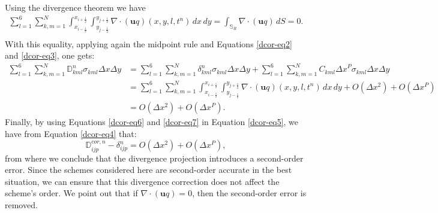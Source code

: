 Using the divergence theorem we have
\begin{align*}
	\sum_{l=1}^6 \sum_{k,m=1}^N
	\int_{x_{i-{\frac{1}{2}}}}^{x_{i+{\frac{1}{2}}}}
	\int_{y_{j-{\frac{1}{2}}}}^{y_{j+{\frac{1}{2}}}}
	\nabla \cdot (\boldsymbol{u} q)(x,y,l,t^n) \,dx \,dy
	= \int_{\mathbb{S}_R} 	\nabla \cdot (\boldsymbol{u} q) \,dS = 0.\\
\end{align*}
With this equality, applying again the midpoint rule and Equations \eqref{dcor-eq2} and \eqref{dcor-eq3}, one gets:
\begin{align}
	\sum_{l=1}^6 \sum_{k,m=1}^N
	\mathbb{D}_{kml}^n \sigma_{kml} {\Delta x \Delta y}  &= 
	\sum_{l=1}^6 \sum_{k,m=1}^N
	\mathbb{\delta }_{kml}^n \sigma_{kml}{\Delta x \Delta y} 
	+\sum_{l=1}^6 \sum_{k,m=1}^N C_{kml} {\Delta x}^P \sigma_{kml} {\Delta x \Delta y}  \nonumber\\
	&= 
	\sum_{l=1}^6 \sum_{k,m=1}^N
	\int_{x_{i-{\frac{1}{2}}}}^{x_{i+{\frac{1}{2}}}}
	\int_{y_{j-{\frac{1}{2}}}}^{y_{j+{\frac{1}{2}}}}
	\nabla \cdot (\boldsymbol{u} q) (x,y,l,t^n) \,dx \,dy
 	+O(\Delta x^2) +  O(\Delta x^P) \nonumber\\
	&= O(\Delta x^2) +  O(\Delta x^P). \label{dcor-eq7}
\end{align}
Finally, by using Equations \eqref{dcor-eq6} and \eqref{dcor-eq7} in Equation \eqref{dcor-eq5}, 
we have from Equation \eqref{dcor-eq4} that:
\begin{equation}
	\label{dcor-eq8}
	\mathbb{D}^{cor,n}_{ijp} - \mathbb{\delta}^n_{ijp} =
	O(\Delta x^2) +  O(\Delta x^P),
\end{equation}
from where we conclude that the divergence projection introduces a second-order error.
Since the schemes considered here are second-order accurate in the best situation, we
can ensure that this divergence correction does not affect the scheme's order.
We point out that if $\nabla \cdot (\boldsymbol{u} q)=0$, then the second-order error is removed.

